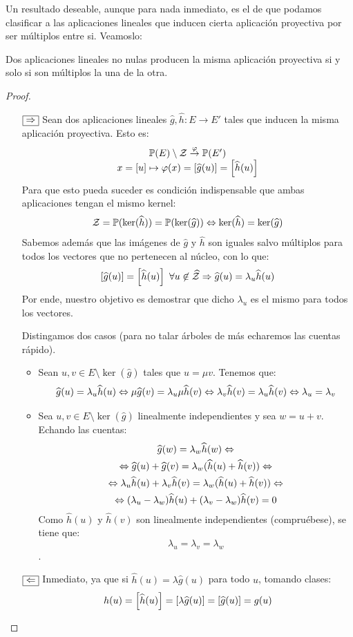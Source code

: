 Un resultado deseable, aunque para nada inmediato, es el de que podamos clasificar a las aplicaciones lineales que inducen cierta aplicación proyectiva por ser múltiplos entre si. Veamoslo:
\begin{theo}
	\label{C4_teo_lemaCorrespondencia}
	Dos aplicaciones lineales no nulas producen la misma aplicación proyectiva si y solo si son múltiplos la una de la otra.
\end{theo}
\begin{proof}
	\begin{itemize}
		\item[$\fbox{$\Rightarrow$}$] Sean dos aplicaciones lineales $\widehat{g},\widehat{h}:E\to E'$ tales que inducen la misma aplicación proyectiva. Esto es:
		\[\begin{array}{c}
		\mathbb{P}(E)\setminus\mathcal{Z}\stackrel{\varphi}{\to}\mathbb{P}(E')\\
		x=\left [ u \right ]\mapsto\varphi(x)=\left [ \widehat{g}(u) \right ]=\left [ \widehat{h}(u) \right ]
		\end{array}\]
		Para que esto pueda suceder es condición indispensable que ambas aplicaciones tengan el mismo kernel:
		\[\mathcal{Z}=\mathbb{P}(\ker(\widehat{h}))=\mathbb{P}(\ker(\widehat{g}))\Leftrightarrow \ker(\widehat{h})=\ker(\widehat{g})\]
		Sabemos además que las imágenes de $\widehat{g}$ y $\widehat{h}$ son iguales salvo múltiplos para todos los vectores que no pertenecen al núcleo, con lo que:
		\[\class{\widehat{g}(u)}=\class{\widehat{h}(u)}\ \forall u\not\in\widehat{\mc{Z}}\ra\widehat{g}(u)=\lambda_u\widehat{h}(u)\]
		Por ende, nuestro objetivo es demostrar que dicho $\lambda_u$ es el mismo para todos los vectores.
		
		Distingamos dos casos (para no talar árboles de más echaremos las cuentas rápido).
		\begin{itemize}
			\item Sean $u,v\in E\setminus\ker(\widehat{g})$ tales que $u=\mu v$. Tenemos que:
			\[
			\widehat{g}(u)=\lambda_u\widehat{h}(u)
			\Leftrightarrow\mu\widehat{g}(v)=\lambda_u\mu\widehat{h}(v)\Leftrightarrow\lambda_v\widehat{h}(v)=\lambda_u\widehat{h}(v)\Leftrightarrow\lambda_u=\lambda_v
			\]
			\item Sea $u,v\in E\setminus\ker(\widehat{g})$ linealmente independientes y sea $w=u+v$. Echando las cuentas:
			\begin{multline}\widehat{g}(w)=\lambda_w\widehat{h}(w)\Leftrightarrow\\\Leftrightarrow\widehat{g}(u)+\widehat{g}(v)=\lambda_w(\widehat{h}(u)+\widehat{h}(v))\Leftrightarrow\\
			\Leftrightarrow \lambda_u\widehat{h}(u)+\lambda_v\widehat{h}(v)=\lambda_w(\widehat{h}(u)+\widehat{h}(v))\Leftrightarrow\\
			\Leftrightarrow(\lambda_u-\lambda_w)\widehat{h}(u)+(\lambda_v-\lambda_w)\widehat{h}(v)=0\end{multline}
			Como $\widehat{h}(u)$ y $\widehat{h}(v)$ son linealmente independientes (compruébese), se tiene que: \[\lambda_u=\lambda_v=\lambda_w\].
		\end{itemize}
		\item[$\fbox{$\Leftarrow$}$] Inmediato, ya que si $\widehat{h}(u)=\lambda\widehat{g}(u)$ para todo $u$, tomando clases:
		\[h(u)=\left [ \widehat{h}(u) \right ]=\left [ \lambda\widehat{g}(u) \right ]=\left [ \widehat{g}(u) \right ]=g(u)\]
	\end{itemize}
\end{proof}
